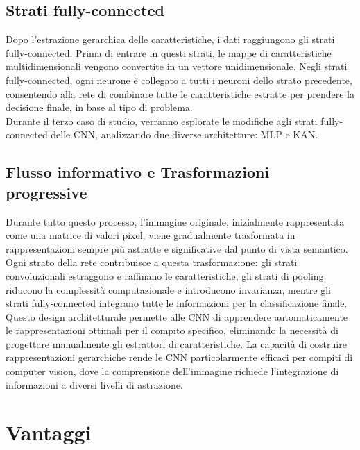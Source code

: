 \documentclass[a4paper,12pt]{report}
\begin{document}
	\subsection{Strati fully-connected}
	Dopo l'estrazione gerarchica delle caratteristiche, i dati raggiungono gli strati fully-connected. Prima di entrare in questi strati, le mappe di caratteristiche multidimensionali vengono convertite in un vettore unidimensionale. Negli strati fully-connected, ogni neurone è collegato a tutti i neuroni dello strato precedente, consentendo alla rete di combinare tutte le caratteristiche estratte per prendere la decisione finale, in base al tipo di problema. \\
	Durante il terzo caso di studio, verranno esplorate le modifiche agli strati fully-connected delle CNN, analizzando due diverse architetture: MLP e KAN.
	
	\subsection{Flusso informativo e Trasformazioni progressive}
	Durante tutto questo processo, l’immagine originale, inizialmente rappresentata come una matrice di valori pixel, viene gradualmente trasformata in rappresentazioni sempre più astratte e significative dal punto di vista semantico. Ogni strato della rete contribuisce a questa trasformazione: gli strati convoluzionali estraggono e raffinano le caratteristiche, gli strati di pooling riducono la complessità computazionale e introducono invarianza, mentre gli strati fully-connected integrano tutte le informazioni per la classificazione finale. \\
	Questo design architetturale permette alle CNN di apprendere automaticamente le rappresentazioni ottimali per il compito specifico, eliminando la necessità di progettare manualmente gli estrattori di caratteristiche. La capacità di costruire rappresentazioni gerarchiche rende le CNN particolarmente efficaci per compiti di computer vision, dove la comprensione dell’immagine richiede l’integrazione di informazioni a diversi livelli di astrazione.
	
	\section{Vantaggi}
	
\end{document}
